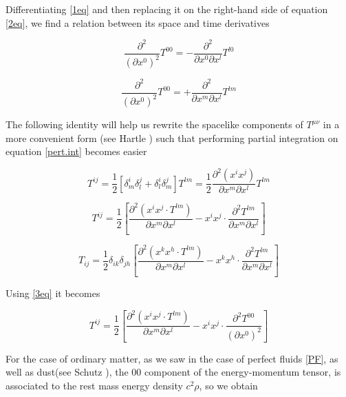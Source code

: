 Differentiating \ref{1eq} and then replacing it on the right-hand side of equation \ref{2eq}, we find a relation between its space and time derivatives 

\begin{equation}
\frac{\partial^2}{({\partial x^0})^2} T^{0 0} = -\frac{\partial^2}{\partial x^0 \partial x^l } T^{l 0}
\end{equation}

\begin{equation}\label{3eq}
\frac{\partial^2}{({\partial x^0})^2} T^{0 0} = + \frac{\partial^2}{\partial x^m \partial x^l } T^{l m}
\end{equation}


The following identity will help us rewrite the spacelike components of $T^{\mu\nu}$  in a more convenient form (see Hartle \cite[chapter X]{Hartle:2021pel}) such that performing partial integration on equation \ref{pert.int} becomes easier 

\begin{equation}
T^{ij} = \frac{1}{2} [\delta^{i}_{m} \delta^{j}_{l} + \delta^{i}_{l} \delta^{j}_{m}] T^{lm} = \frac{1}{2} \frac{\partial^2(x^i x^j)}{\partial x^m \partial x^l} T^{lm}
\end{equation}


\begin{equation}
T^{ij} = \frac{1}{2} \left[  \frac{\partial^2(x^i x^j \cdot T^{lm})}{\partial x^m \partial x^l} - x^i x^j \cdot \frac{\partial^2 T^{lm} }{\partial x^m \partial x^l} \right]
\end{equation}


\begin{equation}\label{0eq}
T_{ij} = \frac{1}{2} \delta_{ik} \delta_{jh} \left[  \frac{\partial^2(x^k x^h \cdot T^{lm})}{\partial x^m \partial x^l} - x^k x^h \cdot \frac{\partial^2 T^{lm} }{\partial x^m \partial x^l} \right]
\end{equation}

Using \ref{3eq} it becomes


\begin{equation}\label{4eq}
T^{ij} = \frac{1}{2} \left[  \frac{\partial^2(x^i x^j \cdot T^{lm})}{\partial x^m \partial x^l} - x^i x^j \cdot \frac{\partial^2 T^{00} }{(\partial {x^0})^2} \right]
\end{equation}

For the case of ordinary matter, as we saw in the case of perfect fluids \ref{PF}, as well as dust(see Schutz \cite[chapter X]{Schutz:1985jx}), the $00$ component of the energy-momentum tensor, is associated to the rest mass energy density $c^2 \rho$, so we obtain 

